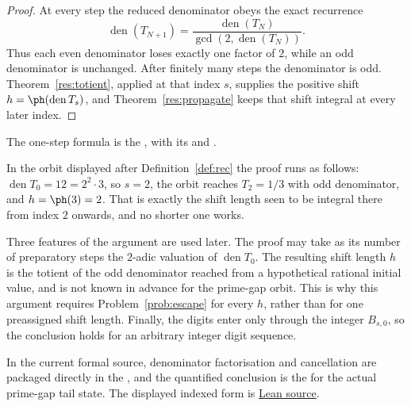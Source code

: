 \documentclass[11pt]{article}
\begin{document}
\begin{proof}
At every step the reduced denominator obeys the exact recurrence
\[
 \operatorname{den}(T_{N+1})
 =\frac{\operatorname{den}(T_N)}{\gcd(2,\operatorname{den}(T_N))}.
\]
Thus each even denominator loses exactly one factor of $2$, while an odd
denominator is unchanged.  After finitely many steps the denominator is odd.
Theorem~\ref{res:totient}, applied at that index $s$, supplies
the positive shift $h=\ph(\operatorname{den}T_s)$, and
Theorem~\ref{res:propagate} keeps that shift integral at every later index.
\end{proof}

\noindent The one-step formula is the
,
with its
and
.

In the orbit displayed after Definition~\ref{def:rec} the proof runs as
follows: $\operatorname{den}T_0=12=2^{2}\cdot3$, so $s=2$, the orbit reaches
$T_2=1/3$ with odd denominator, and $h=\ph(3)=2$.  That is exactly the shift
length seen to be integral there from index $2$ onwards, and no shorter one
works.

Three features of the argument are used later.  The proof may take as its
number of preparatory steps the $2$-adic valuation of
$\operatorname{den}T_0$.  The resulting shift length $h$ is the totient of the
odd denominator reached from a hypothetical rational initial value, and is
not known in advance for the prime-gap orbit.  This is why this argument
requires Problem~\ref{prob:escape} for every $h$, rather than for one
preassigned shift length.  Finally, the digits enter only through the integer
$B_{s,0}$, so the conclusion holds for an arbitrary integer digit sequence.

\noindent In the current formal source, denominator factorisation and
cancellation are packaged directly in the
, and the quantified conclusion is the
 for the actual prime-gap tail state.  The displayed
indexed form is \href{https://github.com/wcook04/plectis-erdos/blob/f36a98bf3d3e6f65f1074e3b800e3293d5b8a51a/ErdosProblems/Erdos251/PaperCoreR7.lean#L84}{Lean source}.
\end{document}
